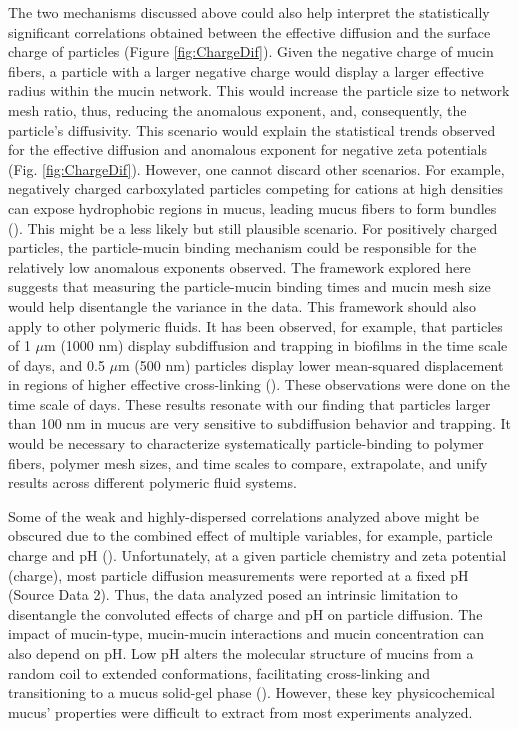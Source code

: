 \documentclass[aps,prl,preprint,superscriptaddress,showkeys,linenumbers]{revtex4-1}
\begin{document}
The two mechanisms discussed above could also help interpret the statistically significant correlations obtained between the effective diffusion and the surface charge of particles (Figure \ref{fig:ChargeDif}). Given the negative charge of mucin fibers, a particle with a larger negative charge would display a larger effective radius within the mucin network. This would increase the particle size to network mesh ratio, thus, reducing the anomalous exponent, and, consequently, the particle's diffusivity. This scenario would explain the statistical trends observed for the effective diffusion and anomalous exponent for negative zeta potentials (Fig. \ref{fig:ChargeDif}).
However, one cannot discard other scenarios. For example, negatively charged carboxylated particles competing for cations at high densities can expose hydrophobic regions in mucus, leading mucus fibers to form bundles (\citealt{LaiPNAS2007,LaiJVirol2009}).
This might be a less likely but still plausible scenario. For positively charged particles, the particle-mucin binding mechanism could be responsible for the relatively low anomalous exponents observed.
The framework explored here suggests that measuring the particle-mucin binding times and mucin mesh size would help disentangle the variance in the data.
\textcolor{Antonio}{This framework should also apply to other polymeric fluids. It has been observed, for example, that particles of 1 $\mu$m (1000 nm) display subdiffusion and trapping in biofilms in the time scale of days, and 0.5 $\mu$m (500 nm) particles display lower mean-squared displacement in regions of higher effective cross-linking (\cite{Chew2014mBio}). These observations were done on the time scale of days. These results resonate with our finding that particles larger than 100 nm in mucus are very sensitive to subdiffusion behavior and trapping. It would be necessary to characterize systematically particle-binding to polymer fibers, polymer mesh sizes, and time scales to compare, extrapolate, and unify results across different polymeric fluid systems}.

Some of the weak and highly-dispersed correlations analyzed above might be obscured due to the combined effect of multiple variables, for example, particle charge and pH (\cite{Leal2017IntJPharm}). Unfortunately, at a given particle chemistry and zeta potential (charge), most particle diffusion measurements were reported at a fixed pH (Source Data 2). Thus, the data analyzed posed an intrinsic limitation to disentangle the convoluted effects of charge and pH on particle diffusion. The impact of mucin-type, mucin-mucin interactions and mucin concentration can also depend on pH. Low pH alters the molecular structure of mucins from a random coil to extended conformations, facilitating cross-linking and transitioning to a mucus solid-gel phase (\cite{Cao1999BiophJ}). However, these key physicochemical mucus’ properties were difficult to extract from most experiments analyzed.
\end{document}
